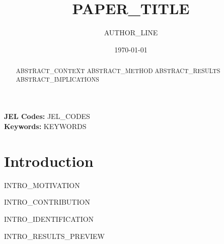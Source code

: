 %
%

\title{ {{PAPER_TITLE}} }
\author{ {{AUTHOR_LINE}} }
\date{\today}


\maketitle

\begin{abstract}
\noindent
{{ABSTRACT_CONTEXT}}
{{ABSTRACT_METHOD}}
{{ABSTRACT_RESULTS}}
{{ABSTRACT_IMPLICATIONS}}
\end{abstract}

\textbf{JEL Codes:} {{JEL_CODES}} \\
\textbf{Keywords:} {{KEYWORDS}}

\newpage

\section{Introduction}
\label{sec:introduction}

{{INTRO_MOTIVATION}}

{{INTRO_CONTRIBUTION}}

{{INTRO_IDENTIFICATION}}

{{INTRO_RESULTS_PREVIEW}}

